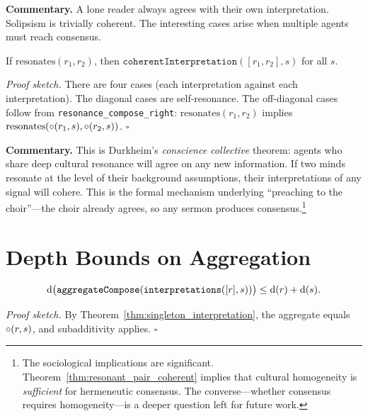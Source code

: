 \noindent\textbf{Commentary.}
A lone reader always agrees with their own interpretation.  Solipsism is
trivially coherent.  The interesting cases arise when multiple agents must
reach consensus.

\begin{theorem}
\label{thm:resonant_pair_coherent}
If $\text{resonates}(r_1, r_2)$, then
$\texttt{coherentInterpretation}([r_1, r_2], s)$ for all $s$.
\end{theorem}

\noindent\textit{Proof sketch.}\quad
There are four cases (each interpretation against each interpretation).
The diagonal cases are self-resonance.  The off-diagonal cases follow from
\texttt{resonance\_compose\_right}: $\text{resonates}(r_1, r_2)$ implies
$\text{resonates}(\circ(r_1, s), \circ(r_2, s))$.
\hfill$\square$

\medskip

\noindent\textbf{Commentary.}
This is Durkheim's \textit{conscience collective} theorem: agents who share
deep cultural resonance will agree on any new information.  If two minds
resonate at the level of their background assumptions, their interpretations
of any signal will cohere.  This is the formal mechanism underlying
``preaching to the choir''---the choir already agrees, so any sermon
produces consensus.\footnote{The sociological implications are significant.
Theorem~\ref{thm:resonant_pair_coherent} implies that cultural homogeneity
is \emph{sufficient} for hermeneutic consensus.  The converse---whether
consensus requires homogeneity---is a deeper question left for future work.}

\section{Depth Bounds on Aggregation}
\label{sec:ch19-depth}

\begin{theorem}
\label{thm:singleton_aggregate_depth}
\[
  \operatorname{d}\bigl(\texttt{aggregateCompose}(\texttt{interpretations}([r], s))\bigr)
  \leq \operatorname{d}(r) + \operatorname{d}(s).
\]
\end{theorem}

\noindent\textit{Proof sketch.}\quad
By Theorem~\ref{thm:singleton_interpretation}, the aggregate equals
$\circ(r, s)$, and subadditivity applies.
\hfill$\square$

\medskip

